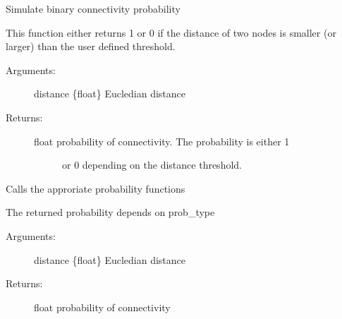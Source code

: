 \documentclass[letterpaper,10pt,english]{sphinxmanual}
\begin{document}
\begin{fulllineitems}
\begin{fulllineitems}
\begin{description}
\end{description}

\end{fulllineitems}


\begin{fulllineitems}
\label{\detokenize{index:environment.Environment.prob_binary}}
Simulate binary connectivity probability

This function either returns 1 or 0 if the distance of two nodes is
smaller (or larger) than the user defined threshold.
\begin{description}
\item[{Arguments:}] \leavevmode
distance \{float\} \textendash{} Eucledian distance

\item[{Returns:}] \leavevmode\begin{description}
\item[{float \textendash{} probability of connectivity. The probability is either 1}] \leavevmode
or 0 depending on the distance threshold.

\end{description}

\end{description}

\end{fulllineitems}


\begin{fulllineitems}
\label{\detokenize{index:environment.Environment.prob_dist}}
Calls the approriate probability functions

The returned probability depends on prob\_type
\begin{description}
\item[{Arguments:}] \leavevmode
distance \{float\} \textendash{} Eucledian distance

\item[{Returns:}] \leavevmode
float \textendash{} probability of connectivity

\end{description}


\end{fulllineitems}
\end{fulllineitems}
\end{document}
